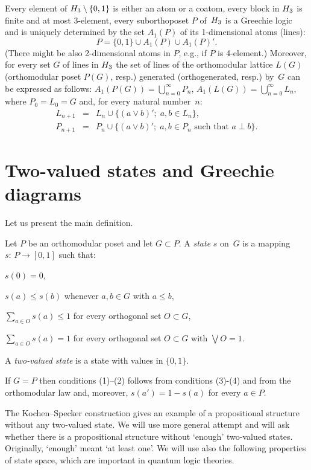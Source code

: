 Every element of $H_3 \setminus \{0,1\}$ is either an atom or a coatom,
every block in $H_3$ is finite and at most 3-element, every suborthoposet
$P$ of~$H_3$ is a Greechie logic and is uniquely determined by the set
$A_1(P)$ of its 1-dimensional atoms (lines):
  $$
  P = \{0,1\} \cup A_1(P) \cup A_1(P)'.
  $$
(There might be also 2-dimensional atoms in $P$, e.g., if $P$ is 4-element.)
Moreover, for every set $G$ of lines in $H_3$ the set of lines of the
orthomodular lattice $L(G)$ (orthomodular poset $P(G)$, resp.) generated
(orthogenerated, resp.) by~$G$ can be expressed as follows: $A_1(P(G)) =
\bigcup_{n=0}^{\infty} P_n$, $A_1(L(G)) = \bigcup_{n=0}^{\infty} L_n$, where
$P_0 =L_0 = G$ and, for every natural number~$n$:
  \begin {eqnarray*}
  L_{n+1} &=& L_n \cup \big\{(a\lor b)';\; a,b \in L_n \big\}, \\
  P_{n+1} &=& P_n \cup \big\{(a\lor b)';\; a,b \in P_n \mbox{ such that }
                  a\perp b \big\}.
  \end {eqnarray*}




\section{Two-valued states and Greechie diagrams}


Let us present the main definition.


\begin {definition} \label{state}
Let $P$ be an orthomodular poset and let $G \subset P$. A {\em state\/} $s$
on~$G$ is a mapping $s\colon\, P \to [0,1]$ such that:
  \begin {conditions}
  \item $s(0)=0$,
  \item $s(a) \le s(b)$ whenever $a,b \in G$ with $a \le b$,
  \item $\sum_{a \in O} s(a) \le 1$ for every orthogonal set $O \subset G$,
  \item $\sum_{a \in O} s(a) = 1$ for every orthogonal set $O \subset G$
        with $\bigvee O =1$.
  \end {conditions}
A {\em two-valued state\/} is a state with values in $\{0,1\}$.
\end {definition}


If $G=P$ then conditions (1)--(2) follows from conditions (3)-(4) and from
the orthomodular law and, moreover, $s(a')=1-s(a)$ for every $a \in P$.

The Kochen--Specker construction gives an example of a propositional
structure without any two-valued state. We will use more general attempt and
will ask whether there is a propositional structure without `enough'
two-valued states. Originally, `enough' meant `at least one'. We will use
also the following properties of state space, which are important in quantum
logic theories.


